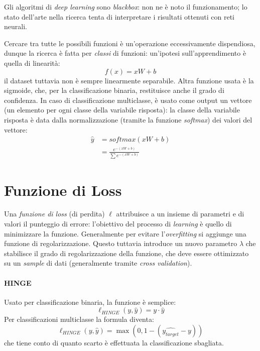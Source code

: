 \documentclass[11pt, a4page]{article}
\begin{document}
Gli algoritmi di \textit{deep learning} sono \textit{blackbox}: non ne è noto il funzionamento; lo stato dell'arte nella ricerca tenta di interpretare i risultati ottenuti con reti neurali.

Cercare tra tutte le possibili funzioni è un'operazione eccessivamente dispendiosa, dunque la ricerca è fatta per \textit{classi} di funzioni: un'ipotesi sull'apprendimento è quella di linearità:
\begin{equation*}
  f(x) = x W + b
\end{equation*}
il dataset tuttavia non è sempre linearmente separabile.
Altra funzione usata è la sigmoide, che, per la classificazione binaria, restituisce anche il grado di confidenza.
In caso di classificazione multiclasse, è usato come output un vettore (un elemento per ogni classe della variabile risposta): la classe della variabile risposta è data dalla normalizzazione (tramite la funzione \textit{softmax}) dei valori del vettore:
\begin{align*}
  \hat{y} &= softmax(xW + b) \\
  &= \frac{e^{-(xW + b)}}{\sum{e^{-(xW + b)}}}
\end{align*}

\section{Funzione di Loss}
Una \textit{funzione di loss} (di perdita) $\ell$ attribuisce a un insieme di parametri e di valori il punteggio di errore: l'obiettivo del processo di \textit{learning} è quello di minimizzare la funzione.
Generalmente per evitare l'\textit{overfitting} si aggiunge una funzione di regolarizzazione.
Questo tuttavia introduce un nuovo parametro $\lambda$ che stabilisce il grado di regolarizzazione della funzione, che deve essere ottimizzato su un \textit{sample} di dati (generalmente tramite \textit{cross validation}).

\paragraph{HINGE}
Usato per classificazione binaria, la funzione è semplice:
\begin{equation*}
  \ell_{HINGE}(y, \hat{y}) = y \cdot \hat{y}
\end{equation*}
Per classificazioni multiclasse la formula diventa:
\begin{equation*}
  \ell_{HINGE} (y, \hat{y}) = \max (0, 1 - (\hat{y_{target}} - y))
\end{equation*}
che tiene conto di quanto scarto è effettuata la classificazione sbagliata.
\end{document}
